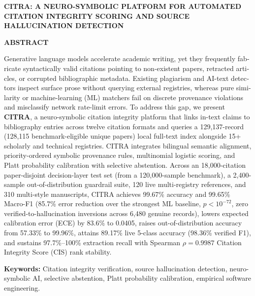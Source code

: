 \clearpage
\pagestyle{empty}
\begin{english}
{\centering
\thispagestyle{empty}
\linespread{1.15}\fontsize{16pt}{22pt}\selectfont\textbf{CITRA: A NEURO-SYMBOLIC PLATFORM FOR AUTOMATED CITATION INTEGRITY SCORING AND SOURCE HALLUCINATION DETECTION}\par}

\vspace{0.45\baselineskip}

{\centering\linespread{1.15}\fontsize{16pt}{22pt}\selectfont\textbf{ABSTRACT}\par}

\vspace{0.55\baselineskip}
\thispagestyle{empty}

Generative language models accelerate academic writing, yet they frequently fabricate syntactically valid citations pointing to non-existent papers, retracted articles, or corrupted bibliographic metadata. Existing plagiarism and AI-text detectors inspect surface prose without querying external registries, whereas pure similarity or machine-learning (ML) matchers fail on discrete provenance violations and misclassify network rate-limit errors. To address this gap, we present \textbf{CITRA}, a neuro-symbolic citation integrity platform that links in-text claims to bibliography entries across twelve citation formats and queries a 129,137-record (128,115 benchmark-eligible unique papers) local full-text index alongside 15+ scholarly and technical registries. CITRA integrates bilingual semantic alignment, priority-ordered symbolic provenance rules, multinomial logistic scoring, and Platt probability calibration with selective abstention. Across an 18,000-citation paper-disjoint decision-layer test set (from a 120,000-sample benchmark), a 2,400-sample out-of-distribution guardrail suite, 120 live multi-registry references, and 310 multi-style manuscripts, CITRA achieves 99.67\% accuracy and 99.65\% Macro-F1 (85.7\% error reduction over the strongest ML baseline, $p < 10^{-72}$, zero verified-to-hallucination inversions across 6,480 genuine records), lowers expected calibration error (ECE) by 83.6\% to 0.0405, raises out-of-distribution accuracy from 57.33\% to 99.96\%, attains 89.17\% live 5-class accuracy (98.36\% verified F1), and sustains 97.7\%--100\% extraction recall with Spearman $\rho = 0.9987$ Citation Integrity Score (CIS) rank stability.

\vspace{0.45\baselineskip}
\noindent\textbf{Keywords:} Citation integrity verification, source hallucination detection, neuro-symbolic AI, selective abstention, Platt probability calibration, empirical software engineering.
\end{english}
\clearpage
